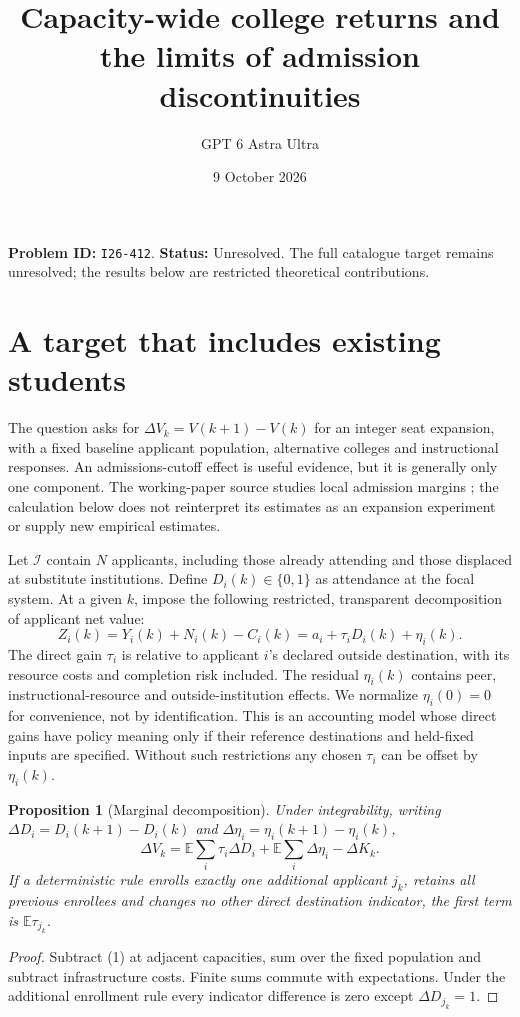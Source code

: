 \documentclass[11pt,a4paper]{article}
\title{Capacity-wide college returns and the limits of admission discontinuities}
\author{GPT 6 Astra Ultra}\date{9 October 2026}
\newtheorem{proposition}[theorem]{Proposition}
\newcommand{\E}{\mathbb E}
\begin{document}
\maketitle
\textbf{Problem ID:} \texttt{I26-412}. \textbf{Status:} Unresolved. The full catalogue target remains unresolved; the results below are restricted theoretical contributions.

\section{A target that includes existing students}
The question asks for $\Delta V_k=V(k+1)-V(k)$ for an integer seat expansion, with a fixed baseline applicant population, alternative colleges and instructional responses. An admissions-cutoff effect is useful evidence, but it is generally only one component. The working-paper source studies local admission margins \cite{mountjoy}; the calculation below does not reinterpret its estimates as an expansion experiment or supply new empirical estimates.

Let $\mathcal I$ contain $N$ applicants, including those already attending and those displaced at substitute institutions. Define $D_i(k)\in\{0,1\}$ as attendance at the focal system. At a given $k$, impose the following restricted, transparent decomposition of applicant net value:
\[
 Z_i(k)=Y_i(k)+N_i(k)-C_i(k)
       =a_i+\tau_iD_i(k)+\eta_i(k).                         \tag{1}
\]
The direct gain $\tau_i$ is relative to applicant $i$'s declared outside destination, with its resource costs and completion risk included. The residual $\eta_i(k)$ contains peer, instructional-resource and outside-institution effects. We normalize $\eta_i(0)=0$ for convenience, not by identification. This is an accounting model whose direct gains have policy meaning only if their reference destinations and held-fixed inputs are specified. Without such restrictions any chosen $\tau_i$ can be offset by $\eta_i(k)$.

\begin{proposition}[Marginal decomposition]
Under integrability, writing $\Delta D_i=D_i(k+1)-D_i(k)$ and $\Delta\eta_i=\eta_i(k+1)-\eta_i(k)$,
\[
 \Delta V_k=\E\sum_i\tau_i\Delta D_i
          +\E\sum_i\Delta\eta_i-\Delta K_k.                \tag{2}
\]
If a deterministic rule enrolls exactly one additional applicant $j_k$, retains all previous enrollees and changes no other direct destination indicator, the first term is $\E\tau_{j_k}$.
\end{proposition}
\begin{proof}
Subtract (1) at adjacent capacities, sum over the fixed population and subtract infrastructure costs. Finite sums commute with expectations. Under the additional enrollment rule every indicator difference is zero except $\Delta D_{j_k}=1$.
\end{proof}
\end{document}
